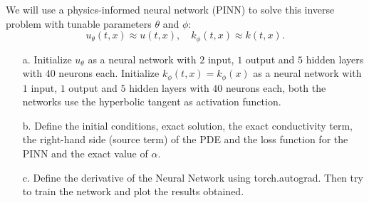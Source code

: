 \documentclass{article}
\begin{document}
We will use a physics-informed neural network (PINN) to solve this inverse problem with tunable parameters $\theta$ and $\phi$:
$$
  u_\theta(t,x) \approx u(t,x), \quad k_\phi(t, x) \approx k(t, x).
$$
\noindent


\begin{itemize}
  \item[a.] Initialize $u_{\theta}$ as a neural network with $2$ input, $1$ output and $5$ hidden layers with $40$ neurons each. Initialize $k_{\phi}(t,x) = k_{\phi}(x)$ as a neural network with $1$ input, $1$ output and $5$ hidden layers with $40$ neurons each, both the networks use the hyperbolic tangent as activation function.
  \item[b.] Define the initial conditions, exact solution, the exact conductivity term, the right-hand side (source term) of the PDE and the loss function for the PINN and the exact value of $\alpha$.
  \item[c.] Define the derivative of the Neural Network using torch.autograd. Then try to train the network and plot the results obtained.
\end{itemize}
\end{document}
